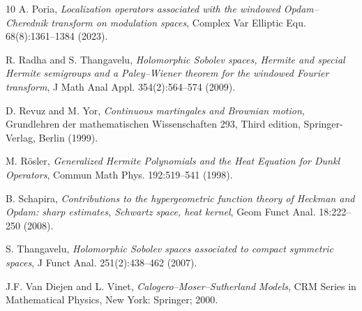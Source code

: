 \documentclass[a4paper,11pt, reqno]{amsart}
\theoremstyle{plain}
\theoremstyle{definition}
\theoremstyle{remark}
\begin{document}
\begin{thebibliography}{10}
A. Poria, {\it Localization operators associated with the windowed Opdam--Cherednik transform on modulation spaces}, Complex Var Elliptic Equ. 68(8):1361--1384 (2023).

R. Radha and S. Thangavelu, {\it Holomorphic Sobolev spaces, Hermite and special Hermite semigroups and a Paley--Wiener theorem for the windowed Fourier transform}, J Math Anal Appl. 354(2):564--574 (2009).

D. Revuz and M. Yor, {\it Continuous martingales and Brownian motion}, Grundlehren der mathematischen Wissenschaften 293, Third edition,  Springer-Verlag, Berlin (1999).

M. R\"osler, {\it Generalized Hermite Polynomials and the Heat Equation for Dunkl Operators}, Commun Math Phys. 192:519--541 (1998).

B. Schapira, {\it Contributions to the hypergeometric function theory of Heckman and Opdam: sharp estimates, Schwartz space, heat kernel}, Geom Funct Anal. 18:222--250 (2008).

S. Thangavelu, {\it Holomorphic Sobolev spaces associated to compact symmetric spaces}, J Funct Anal. 251(2):438--462 (2007).

J.F. Van Diejen and L. Vinet, {\it Calogero--Moser--Sutherland Models},  CRM Series in Mathematical Physics, New York: Springer; 2000.

\end{thebibliography}
\end{document}
